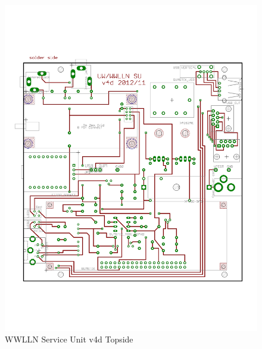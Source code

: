 \begin{figure}[ht!]
   \centering
   \includegraphics[scale=.75]{Appendix/Figures/wwlln_SU_v4_top.pdf} 
   \caption{WWLLN Service Unit v4d Topside}
   \label{su:fig:suTop}
\end{figure}

